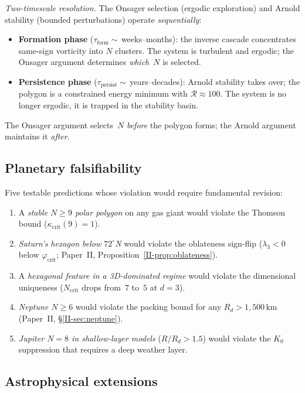 \emph{Two-timescale resolution.}
The Onsager selection (ergodic exploration) and
Arnold stability (bounded perturbations) operate
\emph{sequentially}:
\begin{itemize}
\item \textbf{Formation phase}
  ($\tau_{\mathrm{form}} \sim$\,weeks--months):
  the inverse cascade concentrates same-sign vorticity
  into $N$ clusters.
  The system is turbulent and ergodic;
  the Onsager argument determines \emph{which}~$N$
  is selected.
\item \textbf{Persistence phase}
  ($\tau_{\mathrm{persist}} \sim$\,years--decades):
  Arnold stability takes over;
  the polygon is a constrained energy minimum with
  $\mathcal{R} \approx 100$.
  The system is no longer ergodic, it is trapped
  in the stability basin.
\end{itemize}
The Onsager argument selects~$N$ \emph{before} the polygon
forms; the Arnold argument maintains it \emph{after}.

\subsection{Planetary falsifiability}
\label{sec:planetary-falsifiability}

Five testable predictions whose violation would require
fundamental revision:
\begin{enumerate}
\item A \emph{stable $N \ge 9$ polar polygon} on any
  gas giant would violate the Thomson bound
  ($\kappa_{\mathrm{crit}}(9) = 1$).
\item \emph{Saturn's hexagon below $72^\circ$N}
  would violate the oblateness sign-flip
  ($\lambda_3 < 0$ below $\varphi_{\mathrm{crit}}$;
  Paper~II, Proposition~\ref*{II-prop:oblateness}).
\item A \emph{hexagonal feature in a 3D-dominated regime}
  would violate the dimensional uniqueness
  ($N_{\mathrm{crit}}$ drops from~$7$ to~$5$ at $d = 3$).
\item \emph{Neptune $N \ge 6$} would violate the packing
  bound for any $R_d > 1{,}500$\,km
  (Paper~II, \S\ref*{II-sec:neptune}).
\item \emph{Jupiter $N = 8$ in shallow-layer models}
  ($R/R_d > 1.5$) would violate the $K_0$ suppression
  that requires a deep weather layer.
\end{enumerate}

\subsection{Astrophysical extensions}
\label{sec:stellar-applications}

